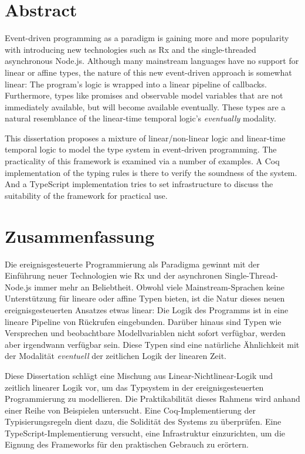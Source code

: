 \chapter*{Abstract}
Event-driven programming as a paradigm is gaining more and more popularity with introducing new technologies such as Rx and the single-threaded asynchronous Node.js. Although many mainstream languages have no support for linear or affine types, the nature of this new event-driven approach is somewhat linear: The program's logic is wrapped into a linear pipeline of callbacks. Furthermore, types like promises and observable model variables that are not immediately available, but will become available eventually. These types are a natural resemblance of the linear-time temporal logic's \textit{eventually} modality.

This dissertation proposes a mixture of linear/non-linear logic and linear-time temporal logic to model the type system in event-driven programming. The practicality of this framework is examined via a number of examples. A Coq implementation of the typing rules is there to verify the soundness of the system. And a TypeScript implementation tries to set infrastructure to discuss the suitability of the framework for practical use.

\chapter*{Zusammenfassung}
Die ereignisgesteuerte Programmierung als Paradigma gewinnt mit der Einführung neuer Technologien wie Rx und der asynchronen Single-Thread-Node.js immer mehr an Beliebtheit. Obwohl viele Mainstream-Sprachen keine Unterstützung für lineare oder affine Typen bieten, ist die Natur dieses neuen ereignisgesteuerten Ansatzes etwas linear: Die Logik des Programms ist in eine lineare Pipeline von Rückrufen eingebunden. Darüber hinaus sind Typen wie Versprechen und beobachtbare Modellvariablen nicht sofort verfügbar, werden aber irgendwann verfügbar sein. Diese Typen sind eine natürliche Ähnlichkeit mit der Modalität \textit{eventuell} der zeitlichen Logik der linearen Zeit.

Diese Dissertation schlägt eine Mischung aus Linear-Nichtlinear-Logik und zeitlich linearer Logik vor, um das Typsystem in der ereignisgesteuerten Programmierung zu modellieren. Die Praktikabilität dieses Rahmens wird anhand einer Reihe von Beispielen untersucht. Eine Coq-Implementierung der Typisierungsregeln dient dazu, die Solidität des Systems zu überprüfen. Eine TypeScript-Implementierung versucht, eine Infrastruktur einzurichten, um die Eignung des Frameworks für den praktischen Gebrauch zu erörtern.